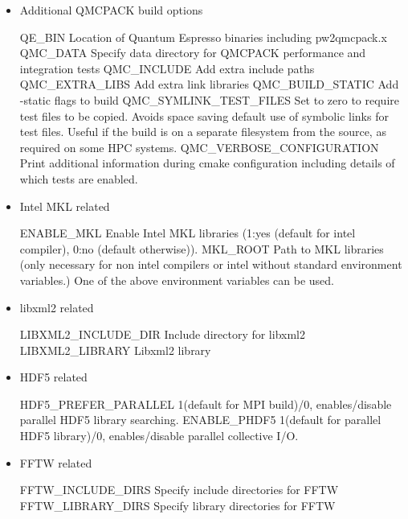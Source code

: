 \begin{itemize}
\item Additional QMCPACK build options

\begin{shade}
QE_BIN                 Location of Quantum Espresso binaries including pw2qmcpack.x
QMC_DATA               Specify data directory for QMCPACK performance and integration tests
QMC_INCLUDE            Add extra include paths
QMC_EXTRA_LIBS         Add extra link libraries
QMC_BUILD_STATIC       Add -static flags to build
QMC_SYMLINK_TEST_FILES Set to zero to require test files to be copied. Avoids space
                       saving default use of symbolic links for test files. Useful
                       if the build is on a separate filesystem from the source, as
                       required on some HPC systems.
QMC_VERBOSE_CONFIGURATION Print additional information during cmake configuration
                          including details of which tests are enabled.
\end{shade}

\item Intel MKL related
%
\begin{shade}
ENABLE_MKL          Enable Intel MKL libraries (1:yes (default for intel compiler),
                                                0:no (default otherwise)).
MKL_ROOT            Path to MKL libraries (only necessary for non intel compilers
                    or intel without standard environment variables.)
                    One of the above environment variables can be used.
\end{shade}

\item libxml2 related
%
\begin{shade}
LIBXML2_INCLUDE_DIR   Include directory for libxml2
LIBXML2_LIBRARY       Libxml2 library
\end{shade}

\item HDF5 related
%
\begin{shade}
HDF5_PREFER_PARALLEL 1(default for MPI build)/0, enables/disable parallel HDF5 library searching.
ENABLE_PHDF5         1(default for parallel HDF5 library)/0, enables/disable parallel collective I/O.
\end{shade}

\item FFTW related
%
\begin{shade}
FFTW_INCLUDE_DIRS   Specify include directories for FFTW
FFTW_LIBRARY_DIRS   Specify library directories for FFTW
\end{shade}


\end{itemize}
